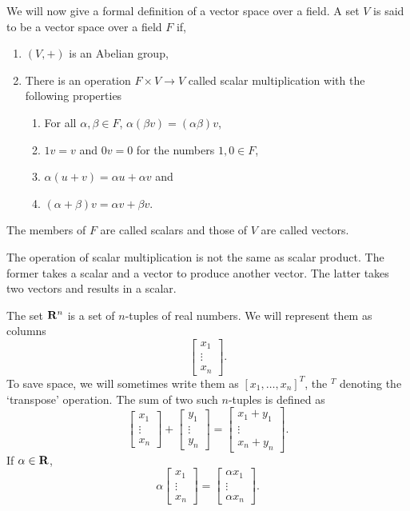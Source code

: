 We will now give a formal definition of a vector space over a field. A set
$V$ is said to be a vector space over a field $F$ if,
\begin{enumerate}
\item $(V, +)$ is an Abelian group,
\item There is an operation $F \times V \rightarrow V$ called scalar 
multiplication with the following properties
\begin{enumerate}
\item For all $\alpha, \beta \in F$, $\alpha(\beta v) = (\alpha\beta)v$,
\item $1v = v$ and $0v = 0$ for the numbers $1, 0 \in F$,
\item $\alpha(u + v) = \alpha u + \alpha v$ and 
\item $(\alpha + \beta)v = \alpha v + \beta v$.
\end{enumerate}
\end{enumerate}
\begin{rem}
The members of $F$ are called scalars and those of $V$ are called vectors.
\end{rem}
\begin{rem}
The operation of scalar multiplication is not the same as scalar product. The
former takes a scalar and a vector to produce another vector. The latter takes
two vectors and results in a scalar.
\end{rem}

The set $\mathbf{R}^n$ is a set of $n$-tuples of real numbers. We will represent them
as columns
\[
\begin{bmatrix} x_1 \\ \vdots \\ x_n\end{bmatrix}.
\]
To save space, we will sometimes write them as $[x_1, \ldots, x_n]^T$, the 
${}^T$ denoting the `transpose' operation. The sum of two such $n$-tuples is 
defined as
\[
\begin{bmatrix} x_1 \\ \vdots \\ x_n\end{bmatrix} + 
\begin{bmatrix} y_1 \\ \vdots \\ y_n\end{bmatrix} =
\begin{bmatrix} x_1 + y_1 \\ \vdots \\ x_n + y_n\end{bmatrix}.
\]
If $\alpha \in \mathbf{R}$,
\[
\alpha\begin{bmatrix} x_1 \\ \vdots \\ x_n\end{bmatrix} 
=\begin{bmatrix} \alpha x_1 \\ \vdots \\ \alpha x_n\end{bmatrix}.
\]


